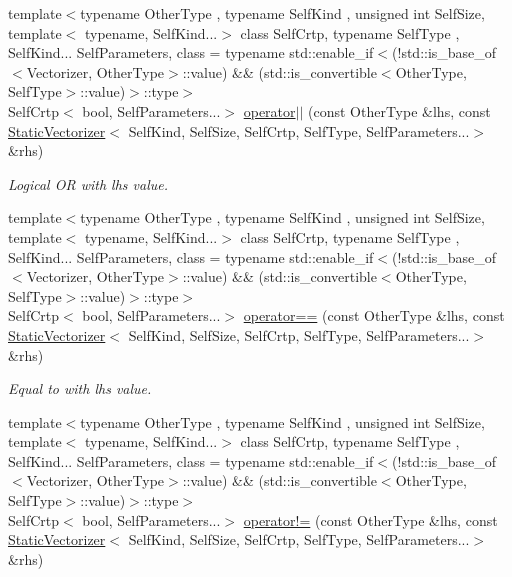 \begin{DoxyCompactItemize}
{\footnotesize template$<$typename Other\-Type , typename Self\-Kind , unsigned int Self\-Size, template$<$ typename, Self\-Kind...$>$ class Self\-Crtp, typename Self\-Type , Self\-Kind... Self\-Parameters, class  = typename std\-::enable\-\_\-if$<$(!std\-::is\-\_\-base\-\_\-of$<$\-Vectorizer, Other\-Type$>$\-::value) \&\& (std\-::is\-\_\-convertible$<$\-Other\-Type, Self\-Type$>$\-::value)$>$\-::type$>$ }\\Self\-Crtp$<$ bool, Self\-Parameters...$>$ \hyperlink{namespacemagrathea_a374ca607affe84170a9ce05bcb5c0bee}{operator$|$$|$} (const Other\-Type \&lhs, const \hyperlink{classmagrathea_1_1StaticVectorizer}{Static\-Vectorizer}$<$ Self\-Kind, Self\-Size, Self\-Crtp, Self\-Type, Self\-Parameters...$>$ \&rhs)
\begin{DoxyCompactList}\small\item\em Logical O\-R with lhs value. \end{DoxyCompactList}\item 
{\footnotesize template$<$typename Other\-Type , typename Self\-Kind , unsigned int Self\-Size, template$<$ typename, Self\-Kind...$>$ class Self\-Crtp, typename Self\-Type , Self\-Kind... Self\-Parameters, class  = typename std\-::enable\-\_\-if$<$(!std\-::is\-\_\-base\-\_\-of$<$\-Vectorizer, Other\-Type$>$\-::value) \&\& (std\-::is\-\_\-convertible$<$\-Other\-Type, Self\-Type$>$\-::value)$>$\-::type$>$ }\\Self\-Crtp$<$ bool, Self\-Parameters...$>$ \hyperlink{namespacemagrathea_a60ce4ee32f8e91922a525e7cd21c0670}{operator==} (const Other\-Type \&lhs, const \hyperlink{classmagrathea_1_1StaticVectorizer}{Static\-Vectorizer}$<$ Self\-Kind, Self\-Size, Self\-Crtp, Self\-Type, Self\-Parameters...$>$ \&rhs)
\begin{DoxyCompactList}\small\item\em Equal to with lhs value. \end{DoxyCompactList}\item 
{\footnotesize template$<$typename Other\-Type , typename Self\-Kind , unsigned int Self\-Size, template$<$ typename, Self\-Kind...$>$ class Self\-Crtp, typename Self\-Type , Self\-Kind... Self\-Parameters, class  = typename std\-::enable\-\_\-if$<$(!std\-::is\-\_\-base\-\_\-of$<$\-Vectorizer, Other\-Type$>$\-::value) \&\& (std\-::is\-\_\-convertible$<$\-Other\-Type, Self\-Type$>$\-::value)$>$\-::type$>$ }\\Self\-Crtp$<$ bool, Self\-Parameters...$>$ \hyperlink{namespacemagrathea_a42bbc042bee09e9a3e95f80e412029ca}{operator!=} (const Other\-Type \&lhs, const \hyperlink{classmagrathea_1_1StaticVectorizer}{Static\-Vectorizer}$<$ Self\-Kind, Self\-Size, Self\-Crtp, Self\-Type, Self\-Parameters...$>$ \&rhs)

\end{DoxyCompactItemize}

